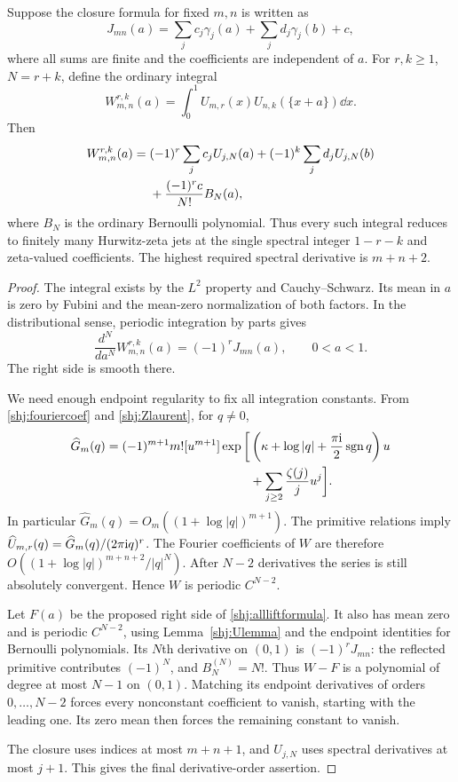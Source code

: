 \begin{theorem}\label{shj:alllift}
Suppose the closure formula for fixed $m,n$ is written as
\begin{equation}\label{shj:linearform}
J_{mn}(a)=\sum_j c_j\gamma_j(a)+\sum_j d_j\gamma_j(b)+c,
\end{equation}
where all sums are finite and the coefficients are independent of $a$.
For $r,k\ge1$, $N=r+k$, define the ordinary integral
\[
W_{m,n}^{r,k}(a)=\int_0^1U_{m,r}(x)U_{n,k}(\{x+a\})\dd x.
\]
Then
\begin{align}
W_{m,n}^{r,k}(a)={}&(-1)^r\sum_j c_jU_{j,N}(a)
+(-1)^k\sum_j d_jU_{j,N}(b)\notag\\
&+\frac{(-1)^r c}{N!}B_N(a),
\label{shj:allliftformula}
\end{align}
where $B_N$ is the ordinary Bernoulli polynomial. Thus every such integral reduces to finitely many Hurwitz-zeta jets at the single spectral integer $1-r-k$ and zeta-valued coefficients. The highest required spectral derivative is $m+n+2$.
\end{theorem}
\begin{proof}
The integral exists by the $L^2$ property and Cauchy--Schwarz. Its mean in $a$ is zero by Fubini and the mean-zero normalization of both factors. In the distributional sense, periodic integration by parts gives
\begin{equation}\label{shj:Wderivative}
\frac{d^N}{da^N}W_{m,n}^{r,k}(a)=(-1)^rJ_{mn}(a),\qquad 0<a<1.
\end{equation}
The right side is smooth there.

We need enough endpoint regularity to fix all integration constants. From \eqref{shj:fouriercoef} and \eqref{shj:Zlaurent}, for $q\ne0$,
\begin{align}
\widehat G_m(q)=(-1)^{m+1}m![u^{m+1}]
\exp\bigg[&\left(\kappa+\log|q|+\frac{\pi\mathrm{i}}{2}\operatorname{sgn} q\right)u\notag\\
&+\sum_{j\ge2}\frac{\zeta(j)}j u^j\bigg].
\label{shj:Gfourier}
\end{align}
In particular $\widehat G_m(q)=O_m((1+\log|q|)^{m+1})$.
The primitive relations imply
$\widehat U_{m,r}(q)=\widehat G_m(q)/(2\pi\mathrm{i} q)^r$.
The Fourier coefficients of $W$ are therefore
$O((1+\log|q|)^{m+n+2}/|q|^N)$.
After $N-2$ derivatives the series is still absolutely convergent. Hence $W$ is periodic $C^{N-2}$.

Let $F(a)$ be the proposed right side of \eqref{shj:allliftformula}. It also has mean zero and is periodic $C^{N-2}$, using Lemma~\ref{shj:Ulemma} and the endpoint identities for Bernoulli polynomials. Its $N$th derivative on $(0,1)$ is $(-1)^rJ_{mn}$: the reflected primitive contributes $(-1)^N$, and $B_N^{(N)}=N!$. Thus $W-F$ is a polynomial of degree at most $N-1$ on $(0,1)$. Matching its endpoint derivatives of orders $0,\ldots,N-2$ forces every nonconstant coefficient to vanish, starting with the leading one. Its zero mean then forces the remaining constant to vanish.

The closure uses indices at most $m+n+1$, and $U_{j,N}$ uses spectral derivatives at most $j+1$. This gives the final derivative-order assertion.
\end{proof}

